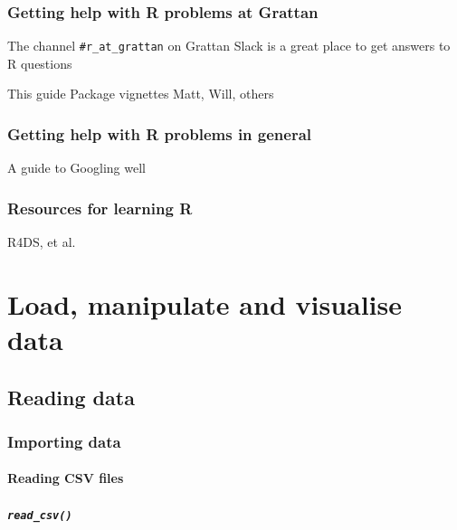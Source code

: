 \documentclass[]{book}
\begin{document}
\hypertarget{getting-help-with-r-problems-at-grattan}{%
\section{Getting help with R problems at Grattan}\label{getting-help-with-r-problems-at-grattan}}

The channel \texttt{\#r\_at\_grattan} on Grattan Slack is a great place to get answers to R questions

This guide
Package vignettes
Matt, Will, others

\hypertarget{getting-help-with-r-problems-in-general}{%
\section{Getting help with R problems in general}\label{getting-help-with-r-problems-in-general}}

A guide to Googling well

\hypertarget{resources-for-learning-r}{%
\section{Resources for learning R}\label{resources-for-learning-r}}

R4DS, et al.

\hypertarget{part-load-manipulate-and-visualise-data}{%
\part{Load, manipulate and visualise data}\label{part-load-manipulate-and-visualise-data}}

\hypertarget{reading-data}{%
\chapter{Reading data}\label{reading-data}}

\hypertarget{importing-data}{%
\section{Importing data}\label{importing-data}}

\hypertarget{reading-csv-files}{%
\subsection{Reading CSV files}\label{reading-csv-files}}

\hypertarget{read_csv}{%
\subsubsection{\texorpdfstring{\texttt{read\_csv()}}{read\_csv()}}\label{read_csv}}
\end{document}
